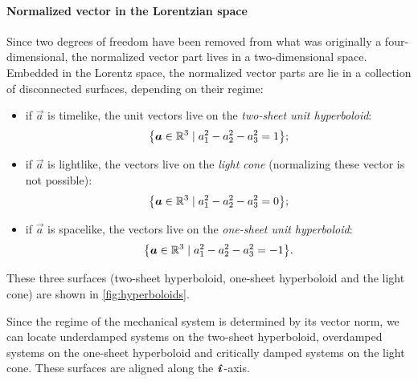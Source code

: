 \paragraph{Normalized vector in the Lorentzian space} Since two degrees of freedom have been removed from what was originally a four-dimensional, the normalized vector part lives in a two-dimensional space. Embedded in the Lorentz space, the normalized vector parts are lie in a collection of disconnected surfaces, depending on their regime:
\begin{itemize}
    \item if $\vec{a}$ is timelike, the unit vectors live on the \emph{two-sheet unit hyperboloid}:
        $$ \qty{\vec{a} \in \real^3 \mid a_1^2 - a_2^2 - a_3^2 = 1};$$
    \item if $\vec{a}$ is lightlike, the vectors live on the \emph{light cone} (normalizing these vector is not possible):
        $$ \qty{\vec{a} \in \real^3 \mid a_1^2 - a_2^2 - a_3^2 = 0}; $$
    \item if $\vec{a}$ is spacelike, the vectors live on the \emph{one-sheet unit hyperboloid}:
        $$ \qty{\vec{a} \in \real^3 \mid a_1^2 - a_2^2 - a_3^2 = -1}. $$
\end{itemize}
These three surfaces (two-sheet hyperboloid, one-sheet hyperboloid and the light cone) are shown in \cref{fig:hyperboloids}. 

Since the regime of the mechanical system is determined by its vector norm, we can locate underdamped systems on the two-sheet hyperboloid, overdamped systems on the one-sheet hyperboloid and critically damped systems on the light cone. These surfaces are aligned along the $\quati$-axis.

